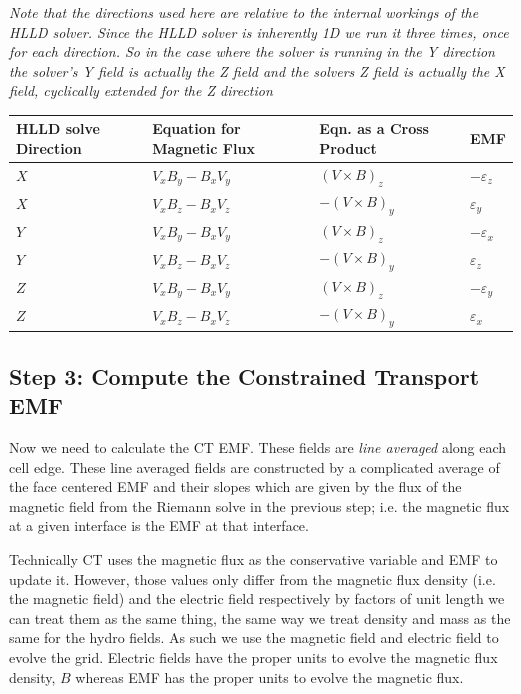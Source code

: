 \emph{Note that the directions used here are relative to the internal workings of the HLLD solver. Since the HLLD solver is inherently 1D we run it three times, once for each direction. So in the case where the solver is running in the Y direction the solver's Y field is actually the Z field and the solvers Z field is actually the X field, cyclically extended for the Z direction}

\begin{table}[!ht]
    \centering
    \begin{tabular}{|l|l|l|l|}
    \hline
        HLLD solve Direction & Equation for Magnetic Flux & Eqn. as a Cross Product & EMF \\ \hline
        $ X $ & $ V_x B_y - B_x V_y $ & $  (V \times B)_z $ & $ -\varepsilon_z $ \\ \hline
        $ X $ & $ V_x B_z - B_x V_z $ & $ -(V \times B)_y $ & $  \varepsilon_y $ \\ \hline
        $ Y $ & $ V_x B_y - B_x V_y $ & $  (V \times B)_z $ & $ -\varepsilon_x $ \\ \hline
        $ Y $ & $ V_x B_z - B_x V_z $ & $ -(V \times B)_y $ & $  \varepsilon_z $ \\ \hline
        $ Z $ & $ V_x B_y - B_x V_y $ & $  (V \times B)_z $ & $ -\varepsilon_y $ \\ \hline
        $ Z $ & $ V_x B_z - B_x V_z $ & $ -(V \times B)_y $ & $  \varepsilon_x $ \\ \hline
    \end{tabular}
\end{table}

\subsection{Step 3: Compute the Constrained Transport EMF}

Now we need to calculate the CT EMF. These fields are \emph{line averaged} along each cell edge. These line averaged fields are constructed by a complicated average of the face centered EMF and their slopes which are given by the flux of the magnetic field from the Riemann solve in the previous step; i.e. the magnetic flux at a given interface is the EMF at that interface.

Technically CT uses the magnetic flux as the conservative variable and EMF to update it. However, those values only differ from the magnetic flux density (i.e. the magnetic field) and the electric field respectively by factors of unit length we can treat them as the same thing, the same way we treat density and mass as the same for the hydro fields\cite{stone_athena_2008}. As such we use the magnetic field and electric field to evolve the grid. Electric fields have the proper units to evolve the magnetic flux density, $ B $ whereas EMF has the proper units to evolve the magnetic flux.

